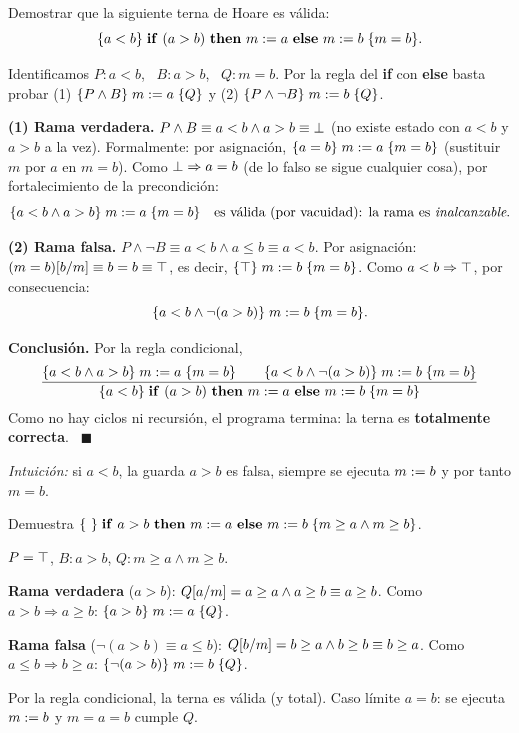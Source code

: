\begin{prob}[\examen]
Demostrar que la siguiente terna de Hoare es válida:
\[\hoare{a<b}{\kw{if}\ (a>b)\ \kw{then}\ m\asg a\ \kw{else}\ m\asg b}{m=b}.\]
\end{prob}
\begin{sol}
Identificamos $P: a<b$, \ $B: a>b$, \ $Q: m=b$. Por la regla del \textbf{if} con \textbf{else} basta probar
(1) $\{P\land B\}\;m\mathrel{:=} a\;\{Q\}$ y (2) $\{P\land\neg B\}\;m\mathrel{:=} b\;\{Q\}$.

\textbf{(1) Rama verdadera.} $P\land B\equiv a<b\land a>b\equiv\bot$ (no existe estado con $a<b$ y $a>b$ a la vez). Formalmente: por asignación, $\{a=b\}\;m\mathrel{:=} a\;\{m=b\}$ (sustituir $m$ por $a$ en $m=b$). Como $\bot\Rightarrow a=b$ (de lo falso se sigue cualquier cosa), por fortalecimiento de la precondición:
\[\{a<b\land a>b\}\;m\mathrel{:=} a\;\{m=b\}\quad\text{es válida (por vacuidad): la rama es \emph{inalcanzable}.}\]

\textbf{(2) Rama falsa.} $P\land\neg B\equiv a<b\land a\le b\equiv a<b$. Por asignación: $(m=b)[b/m]\equiv b=b\equiv\top$, es decir, $\{\top\}\;m\mathrel{:=} b\;\{m=b\}$. Como $a<b\Rightarrow\top$, por consecuencia:
\[\{a<b\land\neg(a>b)\}\;m\mathrel{:=} b\;\{m=b\}.\]

\textbf{Conclusión.} Por la regla condicional,
\[\dfrac{\hoare{a<b\land a>b}{m\asg a}{m=b}\qquad\hoare{a<b\land\neg(a>b)}{m\asg b}{m=b}}{\hoare{a<b}{\kw{if}\ (a>b)\ \kw{then}\ m\asg a\ \kw{else}\ m\asg b}{m=b}}\]
Como no hay ciclos ni recursión, el programa termina: la terna es \textbf{totalmente correcta}. \ $\blacksquare$

\emph{Intuición:} si $a<b$, la guarda $a>b$ es falsa, siempre se ejecuta $m\mathrel{:=} b$ y por tanto $m=b$.
\end{sol}

\begin{prob}
Demuestra $\hoare{\ }{\kw{if}\ a>b\ \kw{then}\ m\asg a\ \kw{else}\ m\asg b}{m\ge a\land m\ge b}$.
\end{prob}
\begin{sol}
$P=\top$, $B: a>b$, $Q: m\ge a\land m\ge b$.

\textbf{Rama verdadera} ($a>b$): $Q[a/m]=a\ge a\land a\ge b\equiv a\ge b$. Como $a>b\Rightarrow a\ge b$: $\{a>b\}\;m\mathrel{:=} a\;\{Q\}$.

\textbf{Rama falsa} ($\neg(a>b)\equiv a\le b$): $Q[b/m]=b\ge a\land b\ge b\equiv b\ge a$. Como $a\le b\Rightarrow b\ge a$: $\{\neg(a>b)\}\;m\mathrel{:=} b\;\{Q\}$.

Por la regla condicional, la terna es válida (y total). Caso límite $a=b$: se ejecuta $m\mathrel{:=} b$ y $m=a=b$ cumple $Q$.
\end{sol}

